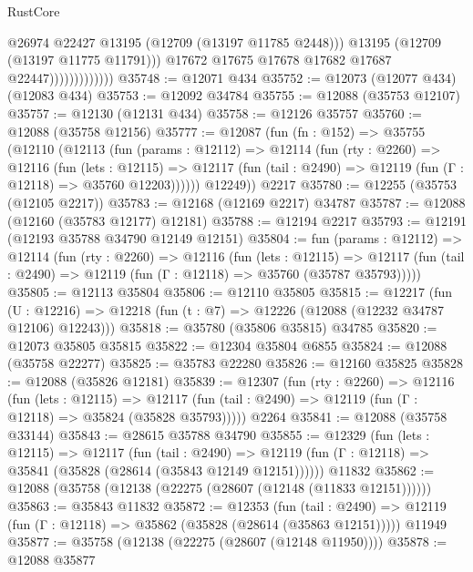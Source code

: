 \begin{lexlean}{RustCore}
\begin{coremodule}
                                  @26974
                                  @22427
                                  @13195
                                  (@12709 (@13197 @11785 @2448)))
                                @13195
                                (@12709 (@13197 @11775 @11791)))
                              @17672
                              @17675
                              @17678
                              @17682
                              @17687
                              @22447)))))))))))))
@35748 := @12071 @434
@35752 := @12073 (@12077 @434) (@12083 @434)
@35753 := @12092 @34784
@35755 := @12088 (@35753 @12107)
@35757 := @12130 (@12131 @434)
@35758 := @12126 @35757
@35760 := @12088 (@35758 @12156)
@35777 := @12087
    (fun (fn : @152) =>
    @35755
      (@12110
        (@12113
          (fun (params : @12112) =>
          @12114
            (fun (rty : @2260) =>
            @12116
              (fun (lets : @12115) =>
              @12117 (fun (tail : @2490) => @12119 (fun (Γ : @12118) => @35760 @12203))))))
        @12249))
    @2217
@35780 := @12255 (@35753 (@12105 @2217))
@35783 := @12168 (@12169 @2217) @34787
@35787 := @12088 (@12160 (@35783 @12177) @12181)
@35788 := @12194 @2217
@35793 := @12191 (@12193 @35788 @34790 @12149 @12151)
@35804 := fun (params : @12112) =>
  @12114
    (fun (rty : @2260) =>
    @12116
      (fun (lets : @12115) =>
      @12117 (fun (tail : @2490) => @12119 (fun (Γ : @12118) => @35760 (@35787 @35793)))))
@35805 := @12113 @35804
@35806 := @12110 @35805
@35815 := @12217
    (fun (U : @12216) => @12218 (fun (t : @7) => @12226 (@12088 (@12232 @34787 @12106) @12243)))
@35818 := @35780 (@35806 @35815) @34785
@35820 := @12073 @35805 @35815
@35822 := @12304 @35804 @6855
@35824 := @12088 (@35758 @22277)
@35825 := @35783 @22280
@35826 := @12160 @35825
@35828 := @12088 (@35826 @12181)
@35839 := @12307
    (fun (rty : @2260) =>
    @12116
      (fun (lets : @12115) =>
      @12117 (fun (tail : @2490) => @12119 (fun (Γ : @12118) => @35824 (@35828 @35793)))))
    @2264
@35841 := @12088 (@35758 @33144)
@35843 := @28615 @35788 @34790
@35855 := @12329
    (fun (lets : @12115) =>
    @12117
      (fun (tail : @2490) =>
      @12119 (fun (Γ : @12118) => @35841 (@35828 (@28614 (@35843 @12149 @12151))))))
    @11832
@35862 := @12088 (@35758 (@12138 (@22275 (@28607 (@12148 (@11833 @12151))))))
@35863 := @35843 @11832
@35872 := @12353
    (fun (tail : @2490) => @12119 (fun (Γ : @12118) => @35862 (@35828 (@28614 (@35863 @12151)))))
    @11949
@35877 := @35758 (@12138 (@22275 (@28607 (@12148 @11950))))
@35878 := @12088 @35877

\end{coremodule}
\end{lexlean}
